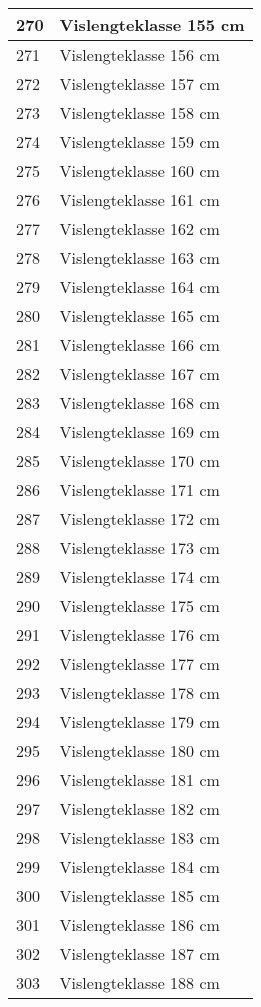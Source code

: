 \documentclass[
]{book}
\begin{document}
\begin{table}
\begin{tabular}[t]{l|l}
\hline
270 & Vislengteklasse 155 cm\\
\hline
271 & Vislengteklasse 156 cm\\
\hline
272 & Vislengteklasse 157 cm\\
\hline
273 & Vislengteklasse 158 cm\\
\hline
274 & Vislengteklasse 159 cm\\
\hline
275 & Vislengteklasse 160 cm\\
\hline
276 & Vislengteklasse 161 cm\\
\hline
277 & Vislengteklasse 162 cm\\
\hline
278 & Vislengteklasse 163 cm\\
\hline
279 & Vislengteklasse 164 cm\\
\hline
280 & Vislengteklasse 165 cm\\
\hline
281 & Vislengteklasse 166 cm\\
\hline
282 & Vislengteklasse 167 cm\\
\hline
283 & Vislengteklasse 168 cm\\
\hline
284 & Vislengteklasse 169 cm\\
\hline
285 & Vislengteklasse 170 cm\\
\hline
286 & Vislengteklasse 171 cm\\
\hline
287 & Vislengteklasse 172 cm\\
\hline
288 & Vislengteklasse 173 cm\\
\hline
289 & Vislengteklasse 174 cm\\
\hline
290 & Vislengteklasse 175 cm\\
\hline
291 & Vislengteklasse 176 cm\\
\hline
292 & Vislengteklasse 177 cm\\
\hline
293 & Vislengteklasse 178 cm\\
\hline
294 & Vislengteklasse 179 cm\\
\hline
295 & Vislengteklasse 180 cm\\
\hline
296 & Vislengteklasse 181 cm\\
\hline
297 & Vislengteklasse 182 cm\\
\hline
298 & Vislengteklasse 183 cm\\
\hline
299 & Vislengteklasse 184 cm\\
\hline
300 & Vislengteklasse 185 cm\\
\hline
301 & Vislengteklasse 186 cm\\
\hline
302 & Vislengteklasse 187 cm\\
\hline
303 & Vislengteklasse 188 cm\\

\end{tabular}
\end{table}
\end{document}
